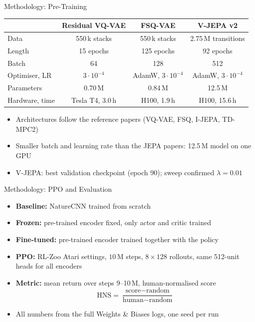 \documentclass[aspectratio=43,10pt]{beamer}
\begin{document}
\begin{frame}{Methodology: Pre-Training}
  \centering
  {\scriptsize\setlength{\tabcolsep}{3pt}
  \begin{tabular}{@{}lccc@{}}
    \toprule
    & Residual VQ-VAE & FSQ-VAE & V-JEPA v2 \\
    \midrule
    Data & 550\,k stacks & 550\,k stacks & 2.75\,M transitions \\
    Length & 15 epochs & 125 epochs & 92 epochs \\
    Batch & 64 & 128 & 512 \\
    Optimiser, LR & $3{\cdot}10^{-4}$ & AdamW, $3{\cdot}10^{-4}$ & AdamW, $3{\cdot}10^{-4}$ \\
    Parameters & 0.70\,M & 0.84\,M & 12.5\,M \\
    Hardware, time & Tesla T4, 3.0\,h & H100, 1.9\,h & H100, 15.6\,h \\
    \bottomrule
  \end{tabular}}
  \vspace{0.8em}
  \begin{itemize}\small\setlength\itemsep{0.4em}
    \item Architectures follow the reference papers (VQ-VAE, FSQ, I-JEPA, TD-MPC2)
    \item Smaller batch and learning rate than the JEPA papers: 12.5\,M model on one GPU
    \item V-JEPA: best validation checkpoint (epoch 90); sweep confirmed $\lambda=0.01$
  \end{itemize}
\end{frame}

\begin{frame}{Methodology: PPO and Evaluation}
  \begin{itemize}\setlength\itemsep{0.55em}
    \item \textbf{Baseline:} NatureCNN trained from scratch
    \item \textbf{Frozen:} pre-trained encoder fixed, only actor and critic trained
    \item \textbf{Fine-tuned:} pre-trained encoder trained together with the policy
    \item \textbf{PPO:} RL-Zoo Atari settings, $10$\,M steps, $8\times128$ rollouts,
          same 512-unit heads for all encoders
    \item \textbf{Metric:} mean return over steps 9--10\,M, human-normalised score
      \[\text{HNS}=\frac{\text{score}-\text{random}}{\text{human}-\text{random}}\]
    \item All numbers from the full Weights \& Biases logs, one seed per run
  \end{itemize}
\end{frame}
\end{document}
